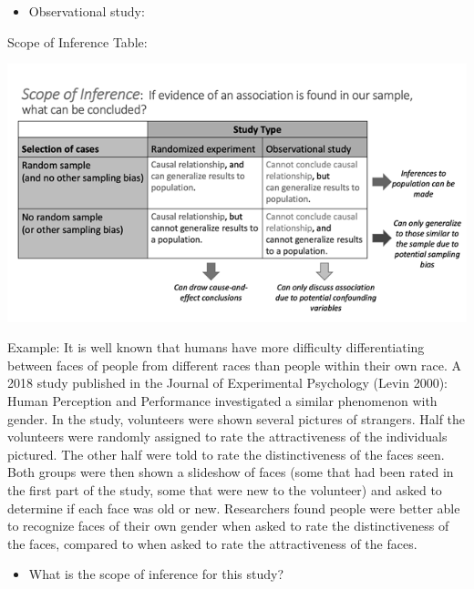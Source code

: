 \documentclass[
]{report}
\providecommand{\tightlist}{%
  \setlength{\itemsep}{0pt}\setlength{\parskip}{0pt}}
\begin{document}
\vspace{0.35in}

\begin{itemize}
\tightlist
\item
  Observational study:
\end{itemize}

\vspace{0.35in}

\newpage

Scope of Inference Table:

\begin{center}\includegraphics[width=0.65\linewidth]{images/ScopeOfInferenceGreyscale} \end{center}

Example: It is well known that humans have more difficulty differentiating between faces of people from different races than people within their own race. A 2018 study published in the Journal of Experimental Psychology (Levin 2000): Human Perception and Performance investigated a similar phenomenon with gender. In the study, volunteers were shown several pictures of strangers. Half the volunteers were randomly assigned to rate the attractiveness of the individuals pictured. The other half were told to rate the distinctiveness of the faces seen. Both groups were then shown a slideshow of faces (some that had been rated in the first part of the study, some that were new to the volunteer) and asked to determine if each face was old or new. Researchers found people were better able to recognize faces of their own gender when asked to rate the distinctiveness of the faces, compared to when asked to rate the attractiveness of the faces.

\begin{itemize}
\tightlist
\item
  What is the scope of inference for this study?
\end{itemize}

\vspace{0.5in}

\end{document}
